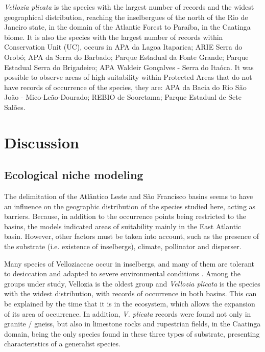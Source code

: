 \textit{Vellozia plicata} is the species with the largest number of records and the widest geographical distribution, reaching the inselbergues of the north of the Rio de Janeiro state, in the domain of the Atlantic Forest to Paraíba, in the Caatinga biome. It is also the species with the largest number of records within Conservation Unit (UC), occurs in APA da Lagoa Itaparica; ARIE Serra do Orobó; APA da Serra do Barbado; Parque Estadual da Fonte Grande; Parque Estadual Serra do Brigadeiro; APA Waldeir Gonçalves - Serra do Itaóca. It was possible to observe areas of high suitability within Protected Areas that do not have records of occurrence of the species, they are: APA da Bacia do Rio São João - Mico-Leão-Dourado; REBIO de Sooretama; Parque Estadual de Sete Salões.


\section{Discussion}

\subsection{Ecological niche modeling}

The delimitation of the Atlântico Leste and São Francisco basins seems to have an influence on the geographic distribution of the species studied here, acting as barriers. Because, in addition to the occurrence points being restricted to the basins, the models indicated areas of suitability mainly in the East Atlantic basin. However, other factors must be taken into account, such as the presence of the substrate (i.e. existence of inselbergs), climate, pollinator and disperser.

Many species of Velloziaceae occur in inselbergs, and many of them are tolerant to desiccation and adapted to severe environmental conditions \citep{porembski2000InvasibilityTropicalGranite}. Among the groups under study, Vellozia is the oldest group \citep{mello-silva2011FiveVicariousGenera} and \textit{Vellozia plicata} is the species with the widest distribution, with records of occurrence in both basins. This can be explained by the time that it is in the ecosystem, which allows the expansion of its area of occurrence. In addition, \textit{V. plicata} records were found not only in granite / gneiss, but also in limestone rocks and rupestrian fields, in the Caatinga domain, being the only species found in these three types of substrate, presenting characteristics of a generalist species.


